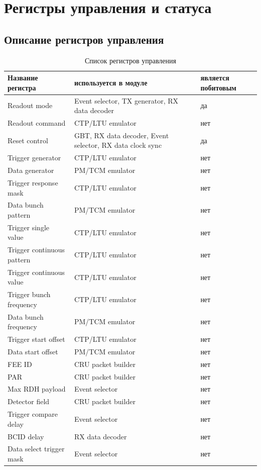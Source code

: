 \documentclass{article}
\begin{document}
\section{Регистры управления и статуса}

\subsection{Описание регистров управления}


\begin{table}[H]
\centering
\begin{tabular}{| l | l | l |}
\hline
Название регистра & используется в модуле & является побитовым \\ \hline
Readout mode & Event selector, TX generator, RX data decoder & да \\ \hline
Readout command & CTP/LTU emulator & нет \\ \hline
Reset control & GBT, RX data decoder, Event selector, RX data clock sync & да \\ \hline
Trigger generator & CTP/LTU emulator & нет \\ \hline
Data generator & PM/TCM emulator & нет \\ \hline
Trigger response mask & CTP/LTU emulator & нет \\ \hline
Data bunch pattern & PM/TCM emulator & нет \\ \hline
Trigger single value & CTP/LTU emulator & нет \\ \hline
Trigger continuous pattern & CTP/LTU emulator & нет \\ \hline
Trigger continuous value & CTP/LTU emulator & нет \\ \hline
Trigger bunch frequency & CTP/LTU emulator & нет \\ \hline
Data bunch frequency & PM/TCM emulator & нет \\ \hline
Trigger start offset & CTP/LTU emulator & нет \\ \hline
Data start offset & PM/TCM emulator & нет \\ \hline
FEE ID & CRU packet builder & нет \\ \hline
PAR & CRU packet builder & нет \\ \hline
Max RDH payload &  Event selector & нет \\ \hline
Detector field & CRU packet builder & нет \\ \hline
Trigger compare delay &  Event selector & нет \\ \hline
BCID delay & RX data decoder & нет \\ \hline
Data select trigger mask &  Event selector & нет \\ \hline
\end{tabular}
\caption{Список регистров управления\label{tab1}}
\end{table}
\end{document}
